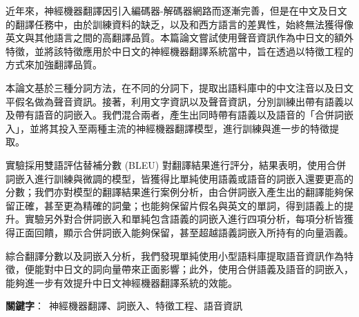 近年來，神經機器翻譯因引入編碼器-解碼器網路而逐漸完善，但是在中文及日文的翻譯任務中，由於訓練資料的缺乏，以及和西方語言的差異性，始終無法獲得像英文與其他語言之間的高翻譯品質。本篇論文嘗試使用聲音資訊作為中日文的額外特徵，並將該特徵應用於中日文的神經機器翻譯系統當中，旨在透過以特徵工程的方式來加強翻譯品質。

本論文基於三種分詞方法，在不同的分詞下，提取出語料庫中的中文注音以及日文平假名做為聲音資訊。接著，利用文字資訊以及聲音資訊，分別訓練出帶有語義以及帶有語音的詞嵌入。我們混合兩者，產生出同時帶有語義以及語音的「合併詞嵌入」，並將其投入至兩種主流的神經機器翻譯模型，進行訓練與進一步的特徵提取。

實驗採用雙語評估替補分數 (BLEU) 對翻譯結果進行評分，結果表明，使用合併詞嵌入進行訓練與微調的模型，皆獲得比單純使用語義或語音的詞嵌入還要更高的分數；我們亦對模型的翻譯結果進行案例分析，由合併詞嵌入產生出的翻譯能夠保留正確，甚至更為精確的詞彙；也能夠保留片假名與英文的單詞，得到語義上的提升。實驗另外對合併詞嵌入和單純包含語義的詞嵌入進行四項分析，每項分析皆獲得正面回饋，顯示合併詞嵌入能夠保留，甚至超越語義詞嵌入所持有的向量涵義。

綜合翻譯分數以及詞嵌入分析，我們發現單純使用小型語料庫提取語音資訊作為特徵，便能對中日文的詞向量帶來正面影響；此外，使用合併語義及語音的詞嵌入，能夠進一步有效提升中日文神經機器翻譯系統的效能。

\begin{flushleft}
\mbox{{\bf 關鍵字}： 神經機器翻譯、詞嵌入、特徵工程、語音資訊}
\end{flushleft}